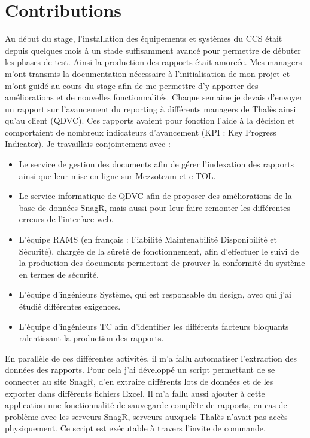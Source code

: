 \section{Contributions}
Au début du stage, l'installation des équipements et systèmes du \gls{CCS} était depuis quelques mois à un stade suffisamment avancé pour permettre de débuter les phases de test.
Ainsi la production des rapports était amorcée.
Mes managers m'ont transmis la documentation nécessaire à l'initialisation de mon projet et m'ont guidé au cours du stage afin de me permettre d'y apporter des améliorations et de nouvelles fonctionnalités.
Chaque semaine je devais d'envoyer un rapport sur l'avancement du \gls{reporting} à différents managers de Thalès ainsi qu'au client (QDVC).
Ces rapports avaient pour fonction l'aide à la décision et comportaient de nombreux indicateurs d'avancement (\gls{KPI} : Key Progress Indicator).
Je travaillais conjointement avec :
\begin{itemize}
\item Le service de gestion des documents afin de gérer l'indexation des rapports ainsi que leur mise en ligne sur \gls{Mezzoteam} et \gls{e-TOL}.
\item Le service informatique de QDVC afin de proposer des améliorations de la base de données SnagR, mais aussi pour leur faire remonter les différentes erreurs de l'interface web.
\item L'équipe \gls{RAMS}  (en français : Fiabilité Maintenabilité Disponibilité et Sécurité), chargée de la sûreté de fonctionnement, afin d'effectuer le suivi de la production des documents permettant de prouver la conformité du système en termes de sécurité.
\item L'équipe d'ingénieurs Système, qui est responsable du design, avec qui j'ai étudié différentes exigences.
\item L'équipe d'ingénieurs \gls{TC} afin d'identifier les différents facteurs bloquants ralentissant la production des rapports.
\end{itemize}


En parallèle de ces différentes activités, il m'a fallu automatiser l'extraction des données des rapports. Pour cela j'ai développé un script permettant de se connecter au site \gls{SnagR}, d'en extraire différents lots de données et de les exporter dans différents fichiers Excel. Il m'a fallu aussi ajouter à cette application une fonctionnalité de sauvegarde complète de rapports, en cas de problème avec les serveurs SnagR, serveurs auxquels Thalès n'avait pas accès physiquement. Ce script est exécutable à travers l'invite de commande.

